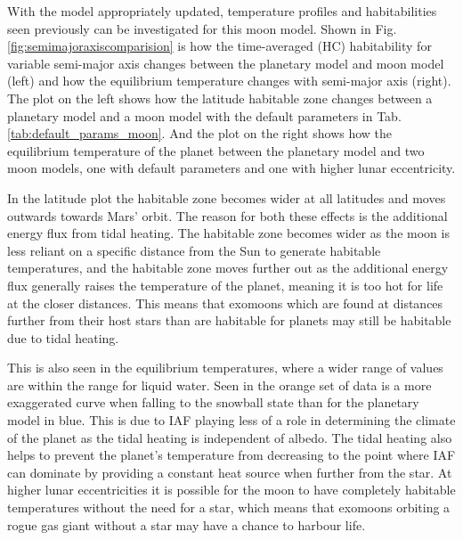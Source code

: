 \documentclass[12pt, onecolumn]{revtex4-2}    %
\begin{document}
With the model appropriately updated, temperature profiles and habitabilities seen previously can be investigated for this moon model.
Shown in Fig. \ref{fig:semimajoraxiscomparision} is how the time-averaged (HC) habitability for variable semi-major axis changes between the planetary model and moon model (left) and how the equilibrium temperature changes with semi-major axis (right). 
The plot on the left shows how the latitude habitable zone changes between a planetary model and a moon model with the default parameters in Tab. \ref{tab:default_params_moon}.
And the plot on the right shows how the equilibrium temperature of the planet between the planetary model and two moon models, one with default parameters and one with higher lunar eccentricity.

In the latitude plot the habitable zone becomes wider at all latitudes and moves outwards towards Mars' orbit.
The reason for both these effects is the additional energy flux from tidal heating.
The habitable zone becomes wider as the moon is less reliant on a specific distance from the Sun to generate habitable temperatures,
and the habitable zone moves further out as the additional energy flux generally raises the temperature of the planet, meaning it is too hot for life at the closer distances.
This means that exomoons which are found at distances further from their host stars than are habitable for planets may still be habitable due to tidal heating.

This is also seen in the equilibrium temperatures, where a wider range of values are within the range for liquid water. 
Seen in the orange set of data is a more exaggerated curve when falling to the snowball state than for the planetary model in blue.
This is due to IAF playing less of a role in determining the climate of the planet as the tidal heating is independent of albedo.
The tidal heating also helps to prevent the planet's temperature from decreasing to the point where IAF can dominate by providing a constant heat source when further from the star.
At higher lunar eccentricities it is possible for the moon to have completely habitable temperatures without the need for a star, which means that exomoons orbiting a rogue gas giant without a star may have a chance to harbour life. 
\end{document}

